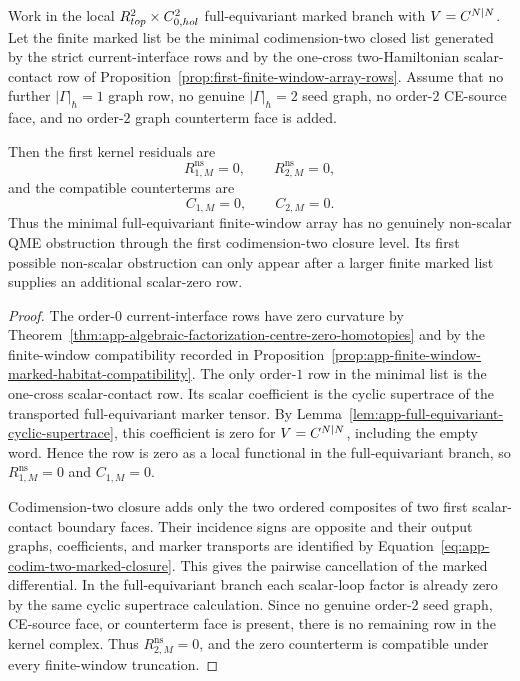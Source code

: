 \begin{thm}
\label{thm:app-minimal-full-equivariant-kernel-vanishing}
  Work in the local
  \(R^2_{top}\times C^2_{0,hol}\)
  full-equivariant marked branch with \(V=C^{N|N}\).  Let the finite
  marked list be the minimal codimension-two closed list generated by the
  strict current-interface rows and by the one-cross two-Hamiltonian
  scalar-contact row of
  Proposition~\ref{prop:first-finite-window-array-rows}.  Assume that no
  further \(|\Gamma|_\hbar=1\) graph row, no genuine
  \(|\Gamma|_\hbar=2\) seed graph, no order-\(2\) CE-source face, and no
  order-\(2\) graph counterterm face is added.

  Then the first kernel residuals are
  \[
    R^{\mathrm{ns}}_{1,M}=0,\qquad
    R^{\mathrm{ns}}_{2,M}=0,
  \]
  and the compatible counterterms are
  \[
    C_{1,M}=0,\qquad C_{2,M}=0 .
  \]
  Thus the minimal full-equivariant finite-window array has no genuinely
  non-scalar QME obstruction through the first codimension-two closure
  level.  Its first possible non-scalar obstruction can only appear after
  a larger finite marked list supplies an additional scalar-zero row.
\end{thm}

\begin{proof}
  The order-\(0\) current-interface rows have zero curvature by
  Theorem~\ref{thm:app-algebraic-factorization-centre-zero-homotopies} and
  by the finite-window compatibility recorded in
  Proposition~\ref{prop:app-finite-window-marked-habitat-compatibility}.
  The only order-\(1\) row in the minimal list is the one-cross
  scalar-contact row.  Its scalar coefficient is the cyclic supertrace of
  the transported full-equivariant marker tensor.  By
  Lemma~\ref{lem:app-full-equivariant-cyclic-supertrace}, this coefficient
  is zero for \(V=C^{N|N}\), including the empty word.  Hence the row is
  zero as a local functional in the full-equivariant branch, so
  \(R^{\mathrm{ns}}_{1,M}=0\) and \(C_{1,M}=0\).

  Codimension-two closure adds only the two ordered composites of two
  first scalar-contact boundary faces.  Their incidence signs are opposite
  and their output graphs, coefficients, and marker transports are
  identified by Equation~\eqref{eq:app-codim-two-marked-closure}.  This
  gives the pairwise cancellation of the marked differential.  In the
  full-equivariant branch each scalar-loop factor is already zero by the
  same cyclic supertrace calculation.  Since no genuine order-\(2\) seed graph,
  CE-source face, or counterterm face is present, there is no remaining
  row in the kernel complex.  Thus \(R^{\mathrm{ns}}_{2,M}=0\), and the
  zero counterterm is compatible under every finite-window truncation.
\end{proof}

